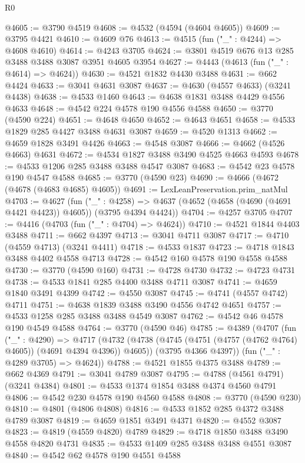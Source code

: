 \begin{lexlean}{R0}
\begin{coremodule}
@4605 := @3790 @4519
@4608 := @4532 (@4594 (@4604 @4605))
@4609 := @3795 @4421
@4610 := @4609 @76
@4613 := @4515 (fun ("_" : @4244) => @4608 @4610)
@4614 := @4243 @3705
@4624 := @3801 @4519 @676 @13 @285 @3488 @3488 @3087 @3951 @4605 @3954
@4627 := @4443 (@4613 (fun ("_" : @4614) => @4624))
@4630 := @4521 @1832 @4430 @3488
@4631 := @662 @4424
@4633 := @3041 @4631 @3087
@4637 := @4630 (@4557 @4633) (@3241 @4438)
@4638 := @4533 @1460
@4643 := @4638 @1831 @3488 @4429 @4556 @4633
@4648 := @4542 @224 @4578 @190 @4556 @4588
@4650 := @3770 (@4590 @224)
@4651 := @4648 @4650
@4652 := @4643 @4651
@4658 := @4533 @1829 @285 @4427 @3488 @4631 @3087
@4659 := @4520 @1313
@4662 := @4659 @1828 @3491 @4426
@4663 := @4548 @3087
@4666 := @4662 (@4526 @4663) @4631
@4672 := @4534 @1827 @3488 @3490 @4525 @4663 @4593
@4678 := @4533 @1206 @285 @3488 @3488 @4547 @3087
@4683 := @4542 @23 @4578 @190 @4547 @4588
@4685 := @3770 (@4590 @23)
@4690 := @4666 (@4672 (@4678 (@4683 @4685) @4605))
@4691 := LexLeanPreservation.prim_natMul
@4703 := @4627
    (fun ("_" : @4258) =>
    @4637 (@4652 (@4658 (@4690 (@4691 @4421 @4423)) @4605)) (@3795 @4394 @4424))
@4704 := @4257 @3705
@4707 := @4416 (@4703 (fun ("_" : @4704) => @4624))
@4710 := @4521 @1844 @4403 @3488
@4711 := @662 @4397
@4713 := @3041 @4711 @3087
@4717 := @4710 (@4559 @4713) (@3241 @4411)
@4718 := @4533 @1837
@4723 := @4718 @1843 @3488 @4402 @4558 @4713
@4728 := @4542 @160 @4578 @190 @4558 @4588
@4730 := @3770 (@4590 @160)
@4731 := @4728 @4730
@4732 := @4723 @4731
@4738 := @4533 @1841 @285 @4400 @3488 @4711 @3087
@4741 := @4659 @1840 @3491 @4399
@4742 := @4550 @3087
@4745 := @4741 (@4557 @4742) @4711
@4751 := @4638 @1839 @3488 @3490 @4556 @4742 @4651
@4757 := @4533 @1258 @285 @3488 @3488 @4549 @3087
@4762 := @4542 @46 @4578 @190 @4549 @4588
@4764 := @3770 (@4590 @46)
@4785 := @4389
    (@4707
      (fun ("_" : @4290) =>
      @4717
        (@4732 (@4738 (@4745 (@4751 (@4757 (@4762 @4764) @4605)) (@4691 @4394 @4396)) @4605))
        (@3795 @4366 @4397))
      (fun ("_" : @4289 @3705) => @4624))
@4788 := @4521 @1855 @4375 @3488
@4789 := @662 @4369
@4791 := @3041 @4789 @3087
@4795 := @4788 (@4561 @4791) (@3241 @4384)
@4801 := @4533 @1374 @1854 @3488 @4374 @4560 @4791
@4806 := @4542 @230 @4578 @190 @4560 @4588
@4808 := @3770 (@4590 @230)
@4810 := @4801 (@4806 @4808)
@4816 := @4533 @1852 @285 @4372 @3488 @4789 @3087
@4819 := @4659 @1851 @3491 @4371
@4820 := @4552 @3087
@4823 := @4819 (@4559 @4820) @4789
@4829 := @4718 @1850 @3488 @3490 @4558 @4820 @4731
@4835 := @4533 @1409 @285 @3488 @3488 @4551 @3087
@4840 := @4542 @62 @4578 @190 @4551 @4588

\end{coremodule}
\end{lexlean}
